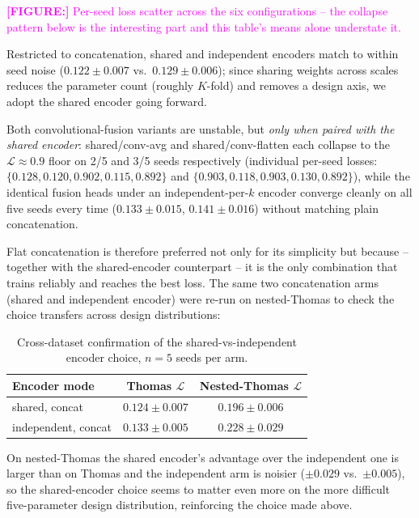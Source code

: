 \documentclass[11pt,letterpaper]{article}
\newcommand{\1}{\mathds{1}}
\newcommand{\fig}[1]{\textcolor{magenta}{\textbf{[FIGURE:] }#1}}
\theoremstyle{plain}
\theoremstyle{definitioncolon}
\begin{document}
\fig{Per-seed loss scatter across the six configurations -- the collapse
pattern below is the interesting part and this table's means alone
understate it.}

Restricted to concatenation, shared and independent encoders match to within
seed noise ($0.122\pm0.007$ vs.\ $0.129\pm0.006$); since sharing weights across
scales reduces the parameter count (roughly $K$-fold) and removes a design
axis, we adopt the shared encoder going forward. 

Both convolutional-fusion variants are unstable, but \emph{only when paired with the shared encoder}:
shared/conv-avg and shared/conv-flatten each collapse to the
$\mathcal{L}\approx0.9$ floor on 2/5 and 3/5 seeds respectively (individual
per-seed losses: $\{0.128, 0.120, 0.902, 0.115, 0.892\}$ and $\{0.903, 0.118,
0.903, 0.130, 0.892\}$), while the identical fusion heads under an
independent-per-$k$ encoder converge cleanly on all five seeds every time
($0.133\pm0.015$, $0.141\pm0.016$) without matching plain concatenation.

Flat concatenation is therefore preferred not only for its simplicity but
because -- together with the shared-encoder counterpart -- it is the only
combination that trains reliably and reaches the best loss. The same two concatenation arms (shared and independent encoder) were
re-run on nested-Thomas to check the choice transfers across design
distributions:

\begin{table}[tbp]
\centering
\small
\begin{tabular}{lcc}
\toprule
Encoder mode & Thomas $\mathcal{L}$ & Nested-Thomas $\mathcal{L}$ \\
\midrule
shared, concat      & $0.124 \pm 0.007$ & $0.196 \pm 0.006$ \\
independent, concat & $0.133 \pm 0.005$ & $0.228 \pm 0.029$ \\
\bottomrule
\end{tabular}
\caption{Cross-dataset confirmation of the shared-vs-independent encoder
choice, $n=5$ seeds per arm.}
\label{tab:encoder-confirm}
\end{table}

On nested-Thomas the shared encoder's advantage over the independent one is
larger than on Thomas and the independent arm is noisier
($\pm0.029$ vs.\ $\pm0.005$), so the shared-encoder choice seems to matter even
more on the more difficult five-parameter design distribution, reinforcing 
the choice made above.
\end{document}
